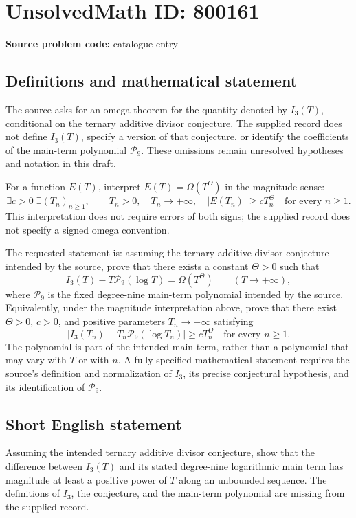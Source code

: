\documentclass[11pt]{article}
\begin{document}
\section*{UnsolvedMath ID: 800161}
\textbf{Source problem code:} catalogue entry
\subsection{Definitions and mathematical statement}
The source asks for an omega theorem for the quantity denoted by \(I_3(T)\), conditional on the ternary additive divisor conjecture. The supplied record does not define \(I_3(T)\), specify a version of that conjecture, or identify the coefficients of the main-term polynomial \(\mathcal P_9\). These omissions remain unresolved hypotheses and notation in this draft.

For a function \(E(T)\), interpret \(E(T)=\Omega(T^\Theta)\) in the magnitude sense:
\[
\exists c>0\;\exists (T_n)_{n\geq 1},\qquad
T_n>0,\quad T_n\longrightarrow+\infty,\quad
|E(T_n)|\geq cT_n^\Theta\quad\text{for every }n\geq1.
\]
This interpretation does not require errors of both signs; the supplied record does not specify a signed omega convention.

The requested statement is: assuming the ternary additive divisor conjecture intended by the source, prove that there exists a constant \(\Theta>0\) such that
\[
I_3(T)-T\mathcal P_9(\log T)=\Omega(T^\Theta)
\qquad(T\to+\infty),
\]
where \(\mathcal P_9\) is the fixed degree-nine main-term polynomial intended by the source. Equivalently, under the magnitude interpretation above, prove that there exist \(\Theta>0\), \(c>0\), and positive parameters \(T_n\to+\infty\) satisfying
\[
\left|I_3(T_n)-T_n\mathcal P_9(\log T_n)\right|
\geq cT_n^\Theta
\quad\text{for every }n\geq1.
\]
The polynomial is part of the intended main term, rather than a polynomial that may vary with \(T\) or with \(n\). A fully specified mathematical statement requires the source's definition and normalization of \(I_3\), its precise conjectural hypothesis, and its identification of \(\mathcal P_9\).
\subsection{Short English statement}
Assuming the intended ternary additive divisor conjecture, show that the difference between \(I_3(T)\) and its stated degree-nine logarithmic main term has magnitude at least a positive power of \(T\) along an unbounded sequence. The definitions of \(I_3\), the conjecture, and the main-term polynomial are missing from the supplied record.
\end{document}
